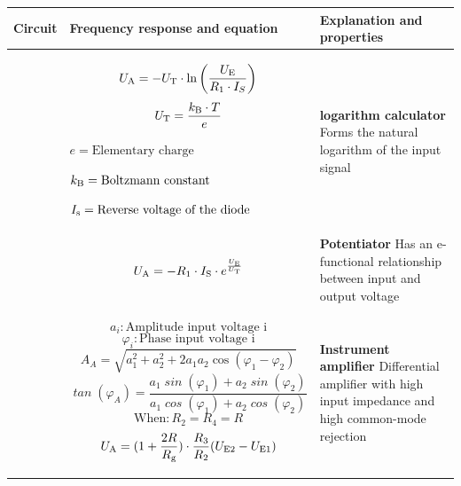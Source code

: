 \newpage
    \begin{table}[ht]
        \begin{tabular}{|m{}|m{}|m{}|}
            \hline 
    Circuit & Frequency response and equation & Explanation and properties \\ %
    \hline
    
    &
    \begin{center}
    \[
    U_{\textnormal{A}} =-U_{\textnormal{T}}\cdot \ln{\left(\frac{U_{\textnormal{E}}}{R_1\cdot I_S}\right)}
    \]
        \[
            U_{\textnormal{T}} = \frac{k_{\textnormal{B}} \cdot T}{e}
            \]
            
            \(e = \text{Elementary charge}\)
            
            \(k_{\textnormal{B}} = \text{Boltzmann constant}\)
            
            \(I_{\textnormal{s}} = \text{Reverse voltage of the diode}\)
    \end{center} 
    & 
    \textbf{logarithm calculator}\newline
    Forms the natural logarithm of the input signal
    \\
    \hline
    
    &
    \begin{center}
    \[
    U_{\textnormal{A}} =-R_1\cdot I_{\textnormal{S}} \cdot e^{\frac{U_{\textnormal{E}}}{U_{\textnormal{T}}}}
    \]
    \end{center} 
    & 
    \textbf{Potentiator}\newline
    Has an e-functional relationship between input and output voltage
    \\
    \hline
    
     &
         \begin{center}
   
\end{center}

\vspace{1ex}
\[
\mathit{a_i} : \text{Amplitude input voltage i}
\]
\[
\mathit{\varphi_i} : \text{Phase input voltage i}
\]
\[
\mathit{A}_{A} = \sqrt{a_1^2 + a_2^2 + 2a_1a_2 \cos(\varphi_1 - \varphi_2)}
\]
\[
\mathit{\tan}(\varphi_A) = \frac{a_1 \mathit{\sin}(\varphi_1) + a_2 \mathit{\sin}(\varphi_2)}{a_1 \mathit{\cos}(\varphi_1) + a_2 \mathit{\cos}(\varphi_2)}
\]
\[
    \text{When} : R_2 = R_4 = R
\]
\[
    U_{\textnormal{A}} = (1+ \frac{2R} {R_{\textnormal{g}}}) \cdot \frac{R_3} {R_2} (U_{\textnormal{E2}}-U_{\textnormal{E1}})
\]
     & 
     \textbf{Instrument amplifier}\newline
    Differential amplifier with high input impedance and high common-mode rejection

    \\
    \hline
    \end{tabular}
\end{table}

